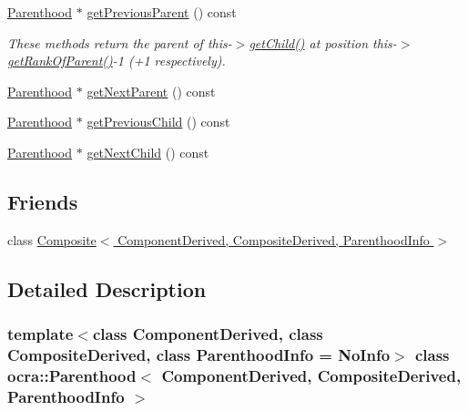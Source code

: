 {\bf }\par
\begin{DoxyCompactItemize}
\item 
\hyperlink{classocra_1_1Parenthood}{Parenthood} $\ast$ \hyperlink{classocra_1_1Parenthood_a541a735ce9bca816dde36abc3625c7cc}{get\+Previous\+Parent} () const
\begin{DoxyCompactList}\small\item\em These methods return the parent of this-\/$>$\hyperlink{classocra_1_1Parenthood_a7056661e3f0e6500141d305e6397f7c0}{get\+Child()} at position this-\/$>$\hyperlink{classocra_1_1Parenthood_a82bb7a676d20350435a07b710de57052}{get\+Rank\+Of\+Parent()}-\/1 (+1 respectively). \end{DoxyCompactList}\item 
\hyperlink{classocra_1_1Parenthood}{Parenthood} $\ast$ \hyperlink{classocra_1_1Parenthood_a550aeaefe0b5901a98e3fb7ca4d4eb9c}{get\+Next\+Parent} () const
\end{DoxyCompactItemize}

{\bf }\par
\begin{DoxyCompactItemize}
\item 
\hyperlink{classocra_1_1Parenthood}{Parenthood} $\ast$ \hyperlink{classocra_1_1Parenthood_a701292fd986632d0ec5c54f783db04ea}{get\+Previous\+Child} () const
\item 
\hyperlink{classocra_1_1Parenthood}{Parenthood} $\ast$ \hyperlink{classocra_1_1Parenthood_a3a39b83562da1e72067ae98934c4d119}{get\+Next\+Child} () const
\end{DoxyCompactItemize}

\subsection*{Friends}
\begin{DoxyCompactItemize}
\item 
class \hyperlink{classocra_1_1Parenthood_a157fe78169803ffbbb7290a687e96f5e}{Composite$<$ Component\+Derived, Composite\+Derived, Parenthood\+Info $>$}
\end{DoxyCompactItemize}


\subsection{Detailed Description}
\subsubsection*{template$<$class Component\+Derived, class Composite\+Derived, class Parenthood\+Info = No\+Info$>$\newline
class ocra\+::\+Parenthood$<$ Component\+Derived, Composite\+Derived, Parenthood\+Info $>$}


